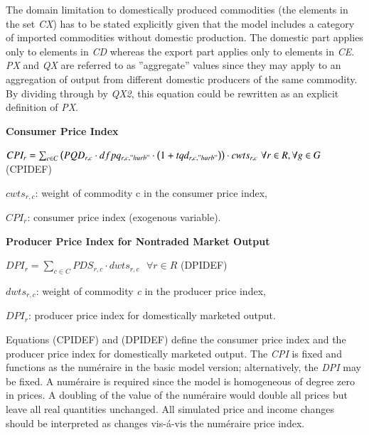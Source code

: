 \documentclass[10pt,a4paper,titlepage,dvipdfmx]{book}
\begin{document}
The domain limitation to domestically produced commodities (the elements in the set \textit{CX}) has to be stated explicitly given that the model includes a category of imported commodities without domestic production. The domestic part applies only to elements in \textit{CD} whereas the export part applies only to elements in \textit{CE}. \textit{PX} and \textit{QX} are referred to as ''aggregate'' values since they may apply to an aggregation of output from different domestic producers of the same commodity. By dividing through by \textit{QX2}, this equation could be rewritten as an explicit definition of \textit{PX}.

\begin{flushleft}\textbf{Consumer Price Index}\end{flushleft}


\begin{center}$CPI_{r}=\sum _{c\in C}\left(PQD_{r,c}\cdot dfpq_{r,c,"hurb"}\cdot \left(1+tqd_{r,c,"hurb"}\right)\right)\cdot cwts_{r,c}\,\,\forall r\in R,\forall g\in G$ (CPIDEF)
\end{center}

\begin{flushleft}
$cwts_{r,c}$: weight of commodity c in the consumer price index,

$CPI_{r}$: consumer price index (exogenous variable).
\end{flushleft}

\begin{flushleft}\textbf{Producer Price Index for Nontraded Market Output}\end{flushleft}


\begin{center}$DPI_{r}=\sum _{c\in C}PDS_{r,c}\cdot dwts_{r,c}\,\,\,\,\forall r\in R$ (DPIDEF)
\end{center}

\begin{flushleft}
$dwts_{r,c}$: weight of commodity \textit{c} in the producer price index,

$DPI_{r}$: producer price index for domestically marketed output.
\end{flushleft}

Equations (CPIDEF) and (DPIDEF) define the consumer price index and the producer price index for domestically marketed output. The \textit{CPI} is fixed and functions as the num\'{e}raire in the basic model version; alternatively, the \textit{DPI} may be fixed. A num\'{e}raire is required since the model is homogeneous of degree zero in prices. A doubling of the value of the num\'{e}raire would double all prices but leave all real quantities unchanged. All simulated price and income changes should be interpreted as changes vis-\'{a}-vis the num\'{e}raire price index.
\end{document}
